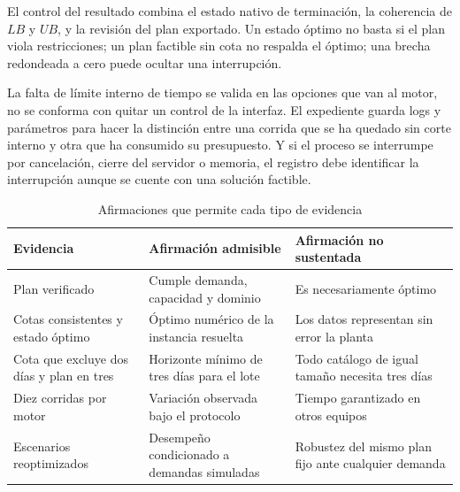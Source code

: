 El control del resultado combina el estado nativo de terminación, la coherencia de $LB$ y $UB$, y la revisión del plan exportado. Un estado óptimo no basta si el plan viola restricciones; un plan factible sin cota no respalda el óptimo; una brecha redondeada a cero puede ocultar una interrupción.

La falta de límite interno de tiempo se valida en las opciones que van al motor, no se conforma con quitar un control de la interfaz. El expediente guarda logs y parámetros para hacer la distinción entre una corrida que se ha quedado sin corte interno y otra que ha consumido su presupuesto. Y si el proceso se interrumpe por cancelación, cierre del servidor o memoria, el registro debe identificar la interrupción aunque se cuente con una solución factible.

\begin{table}[H]\centering\small
\caption{Afirmaciones que permite cada tipo de evidencia}
\begin{tabular}{p{39mm}p{55mm}p{51mm}}\toprule
Evidencia & Afirmación admisible & Afirmación no sustentada\\\midrule
Plan verificado & Cumple demanda, capacidad y dominio & Es necesariamente óptimo\\
Cotas consistentes y estado óptimo & Óptimo numérico de la instancia resuelta & Los datos representan sin error la planta\\
Cota que excluye dos días y plan en tres & Horizonte mínimo de tres días para el lote & Todo catálogo de igual tamaño necesita tres días\\
Diez corridas por motor & Variación observada bajo el protocolo & Tiempo garantizado en otros equipos\\
Escenarios reoptimizados & Desempeño condicionado a demandas simuladas & Robustez del mismo plan fijo ante cualquier demanda\\\bottomrule
\end{tabular}
\end{table}
